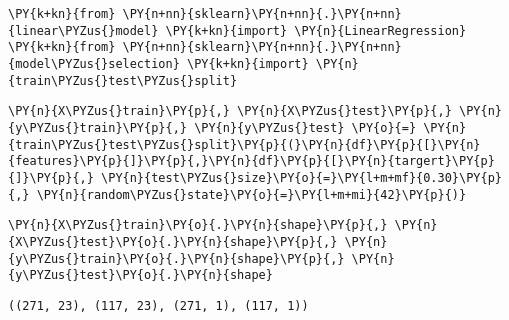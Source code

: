     \begin{tcolorbox}[breakable, size=fbox, boxrule=1pt, pad at break*=1mm,colback=cellbackground, colframe=cellborder]
\begin{Verbatim}[commandchars=\\\{\}]
\PY{k+kn}{from} \PY{n+nn}{sklearn}\PY{n+nn}{.}\PY{n+nn}{linear\PYZus{}model} \PY{k+kn}{import} \PY{n}{LinearRegression}
\PY{k+kn}{from} \PY{n+nn}{sklearn}\PY{n+nn}{.}\PY{n+nn}{model\PYZus{}selection} \PY{k+kn}{import} \PY{n}{train\PYZus{}test\PYZus{}split}
\end{Verbatim}
\end{tcolorbox}

    \begin{tcolorbox}[breakable, size=fbox, boxrule=1pt, pad at break*=1mm,colback=cellbackground, colframe=cellborder]
\begin{Verbatim}[commandchars=\\\{\}]
\PY{n}{X\PYZus{}train}\PY{p}{,} \PY{n}{X\PYZus{}test}\PY{p}{,} \PY{n}{y\PYZus{}train}\PY{p}{,} \PY{n}{y\PYZus{}test} \PY{o}{=} \PY{n}{train\PYZus{}test\PYZus{}split}\PY{p}{(}\PY{n}{df}\PY{p}{[}\PY{n}{features}\PY{p}{]}\PY{p}{,}\PY{n}{df}\PY{p}{[}\PY{n}{targert}\PY{p}{]}\PY{p}{,} \PY{n}{test\PYZus{}size}\PY{o}{=}\PY{l+m+mf}{0.30}\PY{p}{,} \PY{n}{random\PYZus{}state}\PY{o}{=}\PY{l+m+mi}{42}\PY{p}{)}
\end{Verbatim}
\end{tcolorbox}

    \begin{tcolorbox}[breakable, size=fbox, boxrule=1pt, pad at break*=1mm,colback=cellbackground, colframe=cellborder]
\begin{Verbatim}[commandchars=\\\{\}]
\PY{n}{X\PYZus{}train}\PY{o}{.}\PY{n}{shape}\PY{p}{,} \PY{n}{X\PYZus{}test}\PY{o}{.}\PY{n}{shape}\PY{p}{,} \PY{n}{y\PYZus{}train}\PY{o}{.}\PY{n}{shape}\PY{p}{,} \PY{n}{y\PYZus{}test}\PY{o}{.}\PY{n}{shape}
\end{Verbatim}
\end{tcolorbox}

            \begin{tcolorbox}[breakable, size=fbox, boxrule=.5pt, pad at break*=1mm, opacityfill=0]
\begin{Verbatim}[commandchars=\\\{\}]
((271, 23), (117, 23), (271, 1), (117, 1))
\end{Verbatim}
\end{tcolorbox}
        

